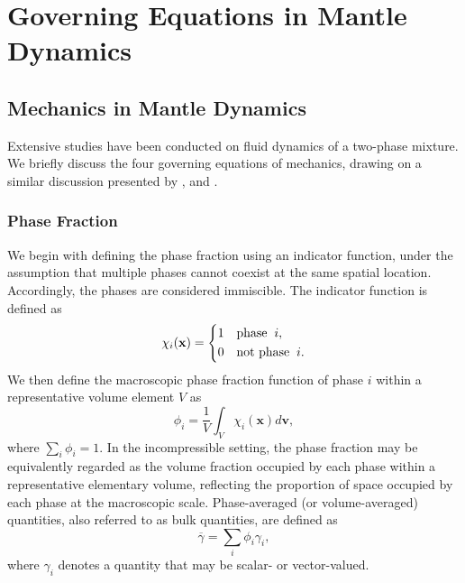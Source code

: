 \chapter[Governing Equations]{Governing Equations in Mantle Dynamics}
\label{chap:equations}
\section{Mechanics in Mantle Dynamics}
\label{sec:mechanics}
Extensive studies have been conducted on fluid dynamics of a two-phase mixture.
We briefly discuss the four governing equations of mechanics, 
drawing on a
similar discussion presented by \citet{AveragedEquationsTwoPhase}, 
\citet{MagmaPhysics} and \citet{DynamicsPartiallyMoltenRock}.

\subsection{Phase Fraction}
We begin with defining the phase fraction using an indicator function, 
under the assumption that multiple phases cannot coexist at the same spatial location. 
Accordingly, the phases are considered immiscible.
The indicator function is defined as
\begin{equation}\label{eq:indicatorfunction}
		  \chi_i(\mathbf{x}) = \left \{ 
		  \begin{aligned}
					 &1 \quad \text{phase}\hspace{0.2cm} i,\\
					 &0 \quad \text{not phase}\hspace{0.2cm} i.
		  \end{aligned}
		  \right.
\end{equation}
We then define the macroscopic phase fraction function of phase $i$ within a representative volume
element $V$ as
\begin{equation}\label{eq:porosityfunction}
		  \phi_i = \frac{1}{V} 
		  \int_{V} \chi_i(\mathbf{x}) d\mathbf{v},
\end{equation}
where $\sum_{i} \phi_i = 1$. In the incompressible setting, 
the phase fraction may be equivalently 
regarded as the volume fraction occupied by each phase within a 
representative elementary volume, reflecting the proportion of space 
occupied by each phase at the macroscopic scale. 
Phase-averaged (or volume-averaged) quantities, 
also referred to as bulk quantities, are defined as 
\begin{equation}\label{eq:bulkquantity}
		  \overline{\gamma}  = \sum_{i} \phi_i \gamma_i,
\end{equation}
where $\gamma_i$ denotes a quantity that may be scalar- or vector-valued. 

